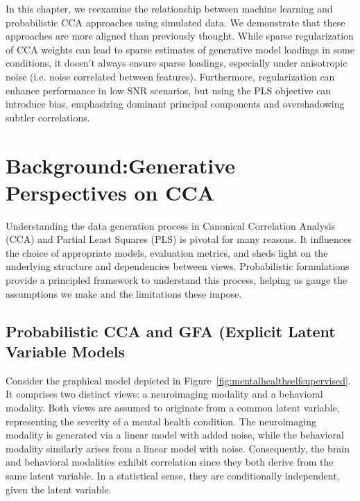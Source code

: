 In this chapter, we reexamine the relationship between machine learning and probabilistic CCA approaches using simulated data.
We demonstrate that these approaches are more aligned than previously thought.
While sparse regularization of CCA weights can lead to sparse estimates of generative model loadings in some conditions, it doesn't always ensure sparse loadings, especially under anisotropic noise (i.e. noise correlated between features).
Furthermore, regularization can enhance performance in low SNR scenarios, but using the PLS objective can introduce bias, emphasizing dominant principal components and overshadowing subtler correlations.

\section{Background:Generative Perspectives on CCA}\label{sec:background}

Understanding the data generation process in Canonical Correlation Analysis (CCA) and Partial Least Squares (PLS) is pivotal for many reasons.
It influences the choice of appropriate models, evaluation metrics, and sheds light on the underlying structure and dependencies between views.
Probabilistic formulations provide a principled framework to understand this process, helping us gauge the assumptions we make and the limitations these impose.

\subsection{Probabilistic CCA and GFA (Explicit Latent Variable Models}\label{subsubsec:a-probabilistic-latent-variable-perspective-on-cca}

Consider the graphical model depicted in Figure~\ref{fig:mentalhealthselfsupervised}.
It comprises two distinct views: a neuroimaging modality and a behavioral modality.
Both views are assumed to originate from a common latent variable, representing the severity of a mental health condition.
The neuroimaging modality is generated via a linear model with added noise, while the behavioral modality similarly arises from a linear model with noise.
Consequently, the brain and behavioral modalities exhibit correlation since they both derive from the same latent variable.
In a statistical sense, they are conditionally independent, given the latent variable.

